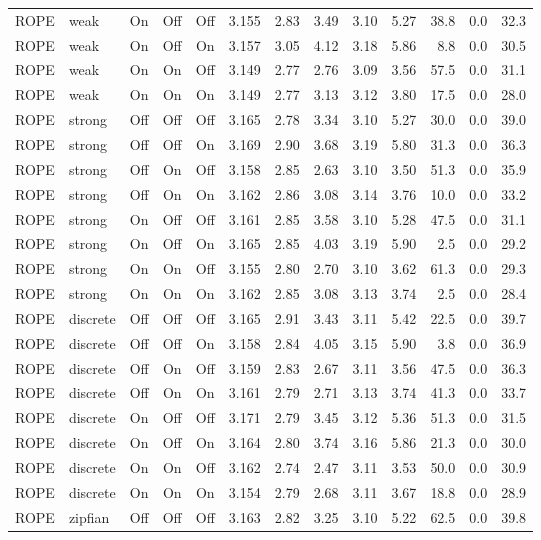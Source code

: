 \begin{longtable}{llcccrrrrrrrr}
ROPE & weak & On & Off & Off & 3.155 & 2.83 & 3.49 & 3.10 & 5.27 & 38.8 & 0.0 & 32.3 \\
ROPE & weak & On & Off & On & 3.157 & 3.05 & 4.12 & 3.18 & 5.86 & 8.8 & 0.0 & 30.5 \\
ROPE & weak & On & On & Off & 3.149 & 2.77 & 2.76 & 3.09 & 3.56 & 57.5 & 0.0 & 31.1 \\
ROPE & weak & On & On & On & 3.149 & 2.77 & 3.13 & 3.12 & 3.80 & 17.5 & 0.0 & 28.0 \\
ROPE & strong & Off & Off & Off & 3.165 & 2.78 & 3.34 & 3.10 & 5.27 & 30.0 & 0.0 & 39.0 \\
ROPE & strong & Off & Off & On & 3.169 & 2.90 & 3.68 & 3.19 & 5.80 & 31.3 & 0.0 & 36.3 \\
ROPE & strong & Off & On & Off & 3.158 & 2.85 & 2.63 & 3.10 & 3.50 & 51.3 & 0.0 & 35.9 \\
ROPE & strong & Off & On & On & 3.162 & 2.86 & 3.08 & 3.14 & 3.76 & 10.0 & 0.0 & 33.2 \\
ROPE & strong & On & Off & Off & 3.161 & 2.85 & 3.58 & 3.10 & 5.28 & 47.5 & 0.0 & 31.1 \\
ROPE & strong & On & Off & On & 3.165 & 2.85 & 4.03 & 3.19 & 5.90 & 2.5 & 0.0 & 29.2 \\
ROPE & strong & On & On & Off & 3.155 & 2.80 & 2.70 & 3.10 & 3.62 & 61.3 & 0.0 & 29.3 \\
ROPE & strong & On & On & On & 3.162 & 2.85 & 3.08 & 3.13 & 3.74 & 2.5 & 0.0 & 28.4 \\
ROPE & discrete & Off & Off & Off & 3.165 & 2.91 & 3.43 & 3.11 & 5.42 & 22.5 & 0.0 & 39.7 \\
ROPE & discrete & Off & Off & On & 3.158 & 2.84 & 4.05 & 3.15 & 5.90 & 3.8 & 0.0 & 36.9 \\
ROPE & discrete & Off & On & Off & 3.159 & 2.83 & 2.67 & 3.11 & 3.56 & 47.5 & 0.0 & 36.3 \\
ROPE & discrete & Off & On & On & 3.161 & 2.79 & 2.71 & 3.13 & 3.74 & 41.3 & 0.0 & 33.7 \\
ROPE & discrete & On & Off & Off & 3.171 & 2.79 & 3.45 & 3.12 & 5.36 & 51.3 & 0.0 & 31.5 \\
ROPE & discrete & On & Off & On & 3.164 & 2.80 & 3.74 & 3.16 & 5.86 & 21.3 & 0.0 & 30.0 \\
ROPE & discrete & On & On & Off & 3.162 & 2.74 & 2.47 & 3.11 & 3.53 & 50.0 & 0.0 & 30.9 \\
ROPE & discrete & On & On & On & 3.154 & 2.79 & 2.68 & 3.11 & 3.67 & 18.8 & 0.0 & 28.9 \\
ROPE & zipfian & Off & Off & Off & 3.163 & 2.82 & 3.25 & 3.10 & 5.22 & 62.5 & 0.0 & 39.8 \\

\end{longtable}
